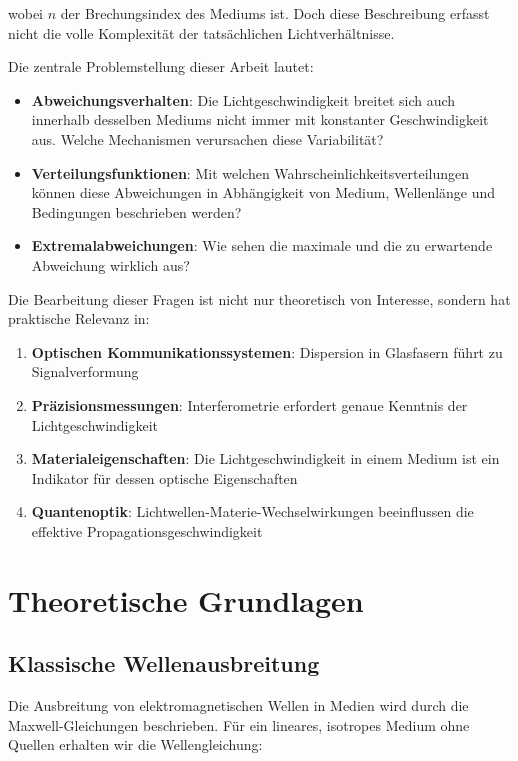 \documentclass[12pt,a4paper,oneside]{article}
\theoremstyle{definition}
\theoremstyle{remark}
\newcommand{\refIndex}{n}
\begin{document}
wobei $\refIndex$ der Brechungsindex des Mediums ist. Doch diese Beschreibung erfasst nicht die volle Komplexität der tatsächlichen Lichtverhältnisse.

Die zentrale Problemstellung dieser Arbeit lautet:
\begin{itemize}
    \item \textbf{Abweichungsverhalten}: Die Lichtgeschwindigkeit breitet sich auch innerhalb desselben Mediums nicht immer mit konstanter Geschwindigkeit aus. Welche Mechanismen verursachen diese Variabilität?
    \item \textbf{Verteilungsfunktionen}: Mit welchen Wahrscheinlichkeitsverteilungen können diese Abweichungen in Abhängigkeit von Medium, Wellenlänge und Bedingungen beschrieben werden?
    \item \textbf{Extremalabweichungen}: Wie sehen die maximale und die zu erwartende Abweichung wirklich aus?
\end{itemize}

Die Bearbeitung dieser Fragen ist nicht nur theoretisch von Interesse, sondern hat praktische Relevanz in:
\begin{enumerate}
    \item \textbf{Optischen Kommunikationssystemen}: Dispersion in Glasfasern führt zu Signalverformung
    \item \textbf{Präzisionsmessungen}: Interferometrie erfordert genaue Kenntnis der Lichtgeschwindigkeit
    \item \textbf{Materialeigenschaften}: Die Lichtgeschwindigkeit in einem Medium ist ein Indikator für dessen optische Eigenschaften
    \item \textbf{Quantenoptik}: Lichtwellen-Materie-Wechselwirkungen beeinflussen die effektive Propagationsgeschwindigkeit
\end{enumerate}

\section{Theoretische Grundlagen}

\subsection{Klassische Wellenausbreitung}

Die Ausbreitung von elektromagnetischen Wellen in Medien wird durch die Maxwell-Gleichungen beschrieben. Für ein lineares, isotropes Medium ohne Quellen erhalten wir die Wellengleichung:
\end{document}
